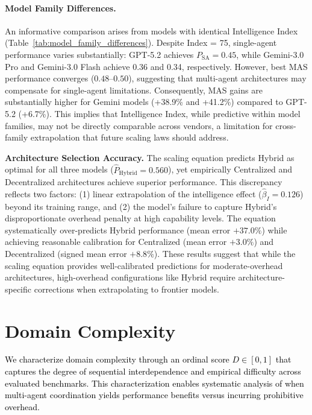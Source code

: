 \paragraph{Model Family Differences.}
An informative comparison arises from models with identical Intelligence Index (Table~\ref{tab:model_family_differences}). Despite Index = 75, single-agent performance varies substantially: GPT-5.2 achieves $P_{\text{SA}} = 0.45$, while Gemini-3.0 Pro and Gemini-3.0 Flash achieve 0.36 and 0.34, respectively. However, best MAS performance converges ($0.48$--$0.50$), suggesting that multi-agent architectures may compensate for single-agent limitations. Consequently, MAS gains are substantially higher for Gemini models (+38.9\% and +41.2\%) compared to GPT-5.2 (+6.7\%). This implies that Intelligence Index, while predictive within model families, may not be directly comparable across vendors, a limitation for cross-family extrapolation that future scaling laws should address.

\textbf{Architecture Selection Accuracy.} The scaling equation predicts Hybrid as optimal for all three models
($\hat{P}_{\text{Hybrid}} = 0.560$), yet empirically Centralized and Decentralized architectures achieve superior performance. This
discrepancy reflects two factors: (1) linear extrapolation of the intelligence effect ($\hat{\beta}_I = 0.126$) beyond its training
range, and (2) the model's failure to capture Hybrid's disproportionate overhead penalty at high capability levels. 
The equation systematically over-predicts Hybrid performance (mean error $+37.0\%$) while achieving reasonable calibration for Centralized (mean error $+3.0\%$) and Decentralized (signed mean error $+8.8\%$). These results suggest that while the scaling equation provides well-calibrated predictions for moderate-overhead architectures, high-overhead configurations like Hybrid require architecture-specific corrections when extrapolating to frontier models.


\section{Domain Complexity}
\label{appendix:domain_complexity}

\textcolor{black}{We characterize domain complexity through an ordinal score $D \in [0,1]$ that captures the degree of sequential interdependence and empirical difficulty across evaluated benchmarks. This characterization enables systematic analysis of when multi-agent coordination yields performance benefits versus incurring prohibitive overhead.}

